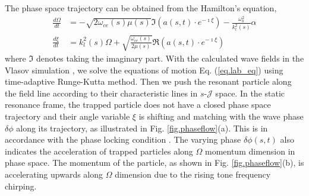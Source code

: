 The phase space trajectory can be obtained from the Hamilton's  equation,
\begin{equation}\label{eq.lab_eq}
    \begin{aligned}
        \frac{d\Omega}{dt} &= - \sqrt{2\omega_{ce}(s)\mu(s)} {\Im} (a(s,t)\cdot e^{-\imath \xi}) - \frac{\omega^2_{b}}{k_l^2(s)} \alpha
        \\
        \frac{d\xi}{dt} &= k_l^2(s) \Omega +\sqrt{\frac{\omega_{ce}(s)}{2\mu(s)}} {\Re}(a(s,t)\cdot e^{-\imath \xi})
    \end{aligned}
\end{equation}
where $\Im$ denotes taking the imaginary part.
With the calculated wave fields  in the Vlasov simulation \cite{zheng2024}, we solve the  equations of motion Eq. (\ref{eq.lab_eq})
 using time-adaptive Runge-Kutta method. Then we push the resonant particle along the field line according to their characteristic lines in $s$-$\mathcal{J}$ space.
In the static resonance frame, the trapped particle does not have a closed phase space trajectory and their angle variable $\xi$ is shifting and matching with the wave phase $\delta \phi$ along its trajectory, as illustrated in Fig. \ref{fig.phaseflow}(a). This is in accordance with the phase locking condition \cite{tao_trap-release-amplify_2021}.
The varying phase $\delta \phi(s,t)$ also indicates the acceleration of trapped particles along $\Omega$ momentum dimension in phase space.
The momentum of the particle, as shown in Fig. \ref{fig.phaseflow}(b), is accelerating upwards along $\Omega$ dimension due to the rising tone frequency chirping.

